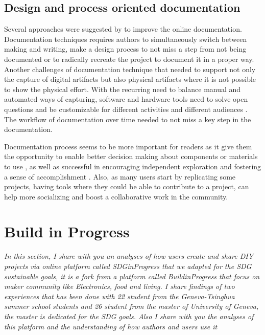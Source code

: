 \subsection{Design and process oriented documentation}
Several approaches were suggested by to improve the online documentation. Documentation techniques requires authors to simultaneously switch between making and writing, make a design process to not miss a step from not being documented or to radically recreate the project to document it in a proper way. Another challenges of documentation technique that needed to support not only the capture of digital artifacts but also physical artifacts where it is not possible to show the physical effort. 
With the recurring need to balance manual and automated ways of capturing, software and hardware tools need to solve open questions and be customizable for different activities and different audiences \cite{Kuznetsov:2010:REA:1868914.1868950}. The workflow of documentation over time needed to not miss a key step in the documentation. 

Documentation process seems to be more important for readers as it give them the opportunity to enable better decision making about components or materials to use \cite{scholar:sf1241364}, as well as successful in encouraging independent exploration and fostering a sense of accomplishment \cite{scholar:lovell2010sewing}. Also, as many users start by replicating some projects, having tools where they could be able to contribute to a project, can help more socializing and boost a collaborative work in the community. 
\section{Build in Progress}

\begin{center}
	\begin{minipage}{.7\textwidth}
		\textit{In this section, I share with you an analyses of how users create and share \textit{DIY} projects via online platform called \textit{SDGinProgress} that we adapted for the SDG sustainable goals, it is a fork from a platform called \textit{BuildinProgress} that focus on maker community like Electronics, food and living. I share findings of two experiences that has been done with 22 student from the Geneva-Tsinghua summer school students and 26 student from the master of University of Geneva, the master is dedicated for the SDG goals. Also I share with you the analyses of this platform and the understanding of how authors and users use it}
	\end{minipage}
\end{center}
